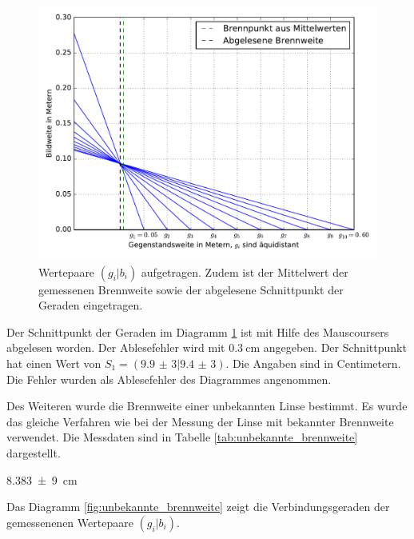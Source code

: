 \begin{figure}
  \centering
  \includegraphics[width=\textwidth]{Pics/Messung1_brennnweite_bekannt.pdf}
  \caption{Wertepaare $(g_i|b_i)$ aufgetragen. Zudem ist der Mittelwert der gemessenen Brennweite sowie der abgelesene Schnittpunkt der Geraden eingetragen.}
  \label{fig:brennweite_bekannt}
\end{figure}

Der Schnittpunkt der Geraden im Diagramm \ref{fig:brennweite_bekannt}
ist mit Hilfe des Mauscoursers abgelesen worden. Der Ablesefehler wird mit
$\SI{0,3}{\centi\meter}$ angegeben.
Der Schnittpunkt hat einen Wert von $S_1 = (\num{9,9(3)}|\num{9,4(3)})$.
Die Angaben sind in Centimetern. Die Fehler wurden als Ablesefehler des Diagrammes angenommen.

Des Weiteren wurde die Brennweite einer unbekannten Linse bestimmt.
Es wurde das gleiche Verfahren wie bei der Messung der Linse mit bekannter
Brennweite verwendet.
Die Messdaten sind in Tabelle \ref{tab:unbekannte_brennweite} dargestellt.

\begin{description}
  \centering
  \item[$<f_2>\ua{gemessen}=$]\SI{8,383(9)}{\centi\meter}
\end{description}

Das Diagramm \ref{fig:unbekannte_brennweite} zeigt die Verbindungsgeraden
der gemessenenen Wertepaare  $(g_i|b_i)$.

